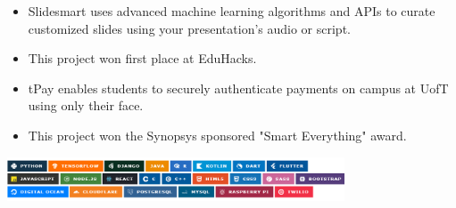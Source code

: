 \documentclass[10pt,a4paper,ragged2e]{altacv}
\begin{document}

\begin{itemize}
\item Slidesmart uses advanced machine learning algorithms and APIs to curate customized slides using your presentation's audio or script.
\item This project won first place at EduHacks.
\end{itemize}
\cvproject{}
\begin{itemize}
\item tPay enables students to securely authenticate payments on campus at UofT using only their face.
\item This project won the Synopsys sponsored "Smart Everything" award.
\end{itemize}
\cvproject{}

\includegraphics[width=100mm,scale=0.6]{favourite technologies 2}




\end{document}
